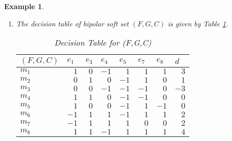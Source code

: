 \documentclass{amsart}
\theoremstyle{plain}
\newtheorem{example}{Example}
\numberwithin{equation}{section}
\begin{document}
\begin{example}
\begin{enumerate}
\item The decision table of bipolar soft set $(F,G,C)$ is given by Table \ref{TableKey copy(4)}.

\begin{table}[h] \centering\begin{tabular}{|l|l|l|l|l|l|l|l|}
\hline
$(F,G,C)$ & $e_{1}$ & $e_{3}$ & $e_{4}$ & $e_{5}$ & $e_{7}$ & $e_{8}$ & $d$
\\ \hline
$m_{1}$ & \multicolumn{1}{|r|}{$1$} & \multicolumn{1}{|r|}{$0$} & 
\multicolumn{1}{|r|}{$-1$} & \multicolumn{1}{|r|}{$1$} & 
\multicolumn{1}{|r|}{$1$} & \multicolumn{1}{|r|}{$1$} & \multicolumn{1}{|r|}{$3$} \\ \hline
$m_{2}$ & \multicolumn{1}{|r|}{$0$} & \multicolumn{1}{|r|}{$1$} & 
\multicolumn{1}{|r|}{$0$} & \multicolumn{1}{|r|}{$-1$} & 
\multicolumn{1}{|r|}{$1$} & \multicolumn{1}{|r|}{$0$} & \multicolumn{1}{|r|}{$1$} \\ \hline
$m_{3}$ & \multicolumn{1}{|r|}{$0$} & \multicolumn{1}{|r|}{$0$} & 
\multicolumn{1}{|r|}{$-1$} & \multicolumn{1}{|r|}{$-1$} & 
\multicolumn{1}{|r|}{$-1$} & \multicolumn{1}{|r|}{$0$} & 
\multicolumn{1}{|r|}{$-3$} \\ \hline
$m_{4}$ & \multicolumn{1}{|r|}{$1$} & \multicolumn{1}{|r|}{$1$} & 
\multicolumn{1}{|r|}{$0$} & \multicolumn{1}{|r|}{$-1$} & 
\multicolumn{1}{|r|}{$-1$} & \multicolumn{1}{|r|}{$0$} & 
\multicolumn{1}{|r|}{$0$} \\ \hline
$m_{5}$ & \multicolumn{1}{|r|}{$1$} & \multicolumn{1}{|r|}{$0$} & 
\multicolumn{1}{|r|}{$0$} & \multicolumn{1}{|r|}{$-1$} & 
\multicolumn{1}{|r|}{$1$} & \multicolumn{1}{|r|}{$-1$} & 
\multicolumn{1}{|r|}{$0$} \\ \hline
$m_{6}$ & \multicolumn{1}{|r|}{$-1$} & \multicolumn{1}{|r|}{$1$} & 
\multicolumn{1}{|r|}{$1$} & \multicolumn{1}{|r|}{$-1$} & 
\multicolumn{1}{|r|}{$1$} & \multicolumn{1}{|r|}{$1$} & \multicolumn{1}{|r|}{$2$} \\ \hline
$m_{7}$ & \multicolumn{1}{|r|}{$-1$} & \multicolumn{1}{|r|}{$1$} & 
\multicolumn{1}{|r|}{$1$} & \multicolumn{1}{|r|}{$1$} & \multicolumn{1}{|r|}{$0$} & \multicolumn{1}{|r|}{$0$} & \multicolumn{1}{|r|}{$2$} \\ \hline
$m_{8}$ & \multicolumn{1}{|r|}{$1$} & \multicolumn{1}{|r|}{$1$} & 
\multicolumn{1}{|r|}{$-1$} & \multicolumn{1}{|r|}{$1$} & 
\multicolumn{1}{|r|}{$1$} & \multicolumn{1}{|r|}{$1$} & \multicolumn{1}{|r|}{$4$} \\ \hline
\end{tabular}\caption{Decision Table for (F,G,C)}\label{TableKey copy(4)}\end{table}

\end{enumerate}
\end{example}
\end{document}
